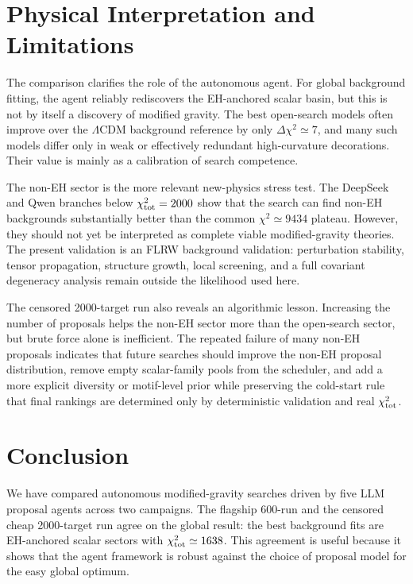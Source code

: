 \documentclass[aps,prd,twocolumn,superscriptaddress,nofootinbib,longbibliography]{revtex4-2}
\newcommand{\chiT}{\chi^2_{\rm tot}}
\begin{document}
\section{Physical Interpretation and Limitations}
\label{sec:validation-boundaries}

The comparison clarifies the role of the autonomous agent.  For global background fitting, the agent reliably rediscovers the EH-anchored scalar basin, but this is not by itself a discovery of modified gravity.  The best open-search models often improve over the $\Lambda$CDM background reference by only $\Delta\chi^2\simeq7$, and many such models differ only in weak or effectively redundant high-curvature decorations.  Their value is mainly as a calibration of search competence.

The non-EH sector is the more relevant new-physics stress test.  The DeepSeek and Qwen branches below $\chiT=2000$ show that the search can find non-EH backgrounds substantially better than the common $\chi^2\simeq9434$ plateau.  However, they should not yet be interpreted as complete viable modified-gravity theories.  The present validation is an FLRW background validation: perturbation stability, tensor propagation, structure growth, local screening, and a full covariant degeneracy analysis remain outside the likelihood used here.

The censored 2000-target run also reveals an algorithmic lesson.  Increasing the number of proposals helps the non-EH sector more than the open-search sector, but brute force alone is inefficient.  The repeated failure of many non-EH proposals indicates that future searches should improve the non-EH proposal distribution, remove empty scalar-family pools from the scheduler, and add a more explicit diversity or motif-level prior while preserving the cold-start rule that final rankings are determined only by deterministic validation and real $\chiT$.

\section{Conclusion}
\label{sec:conclusion}

We have compared autonomous modified-gravity searches driven by five LLM proposal agents across two campaigns.  The flagship 600-run and the censored cheap 2000-target run agree on the global result: the best background fits are EH-anchored scalar sectors with $\chiT\simeq1638$.  This agreement is useful because it shows that the agent framework is robust against the choice of proposal model for the easy global optimum.
\end{document}
